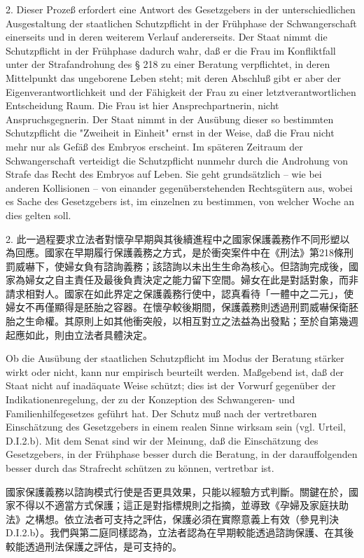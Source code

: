 \documentclass[12pt]{article}
\begin{document}
\begin{sourcepara}[title={原文SondervotumMS.278}]
2. Dieser Prozeß erfordert eine Antwort des Gesetzgebers in der unterschiedlichen Ausgestaltung der staatlichen Schutzpflicht in der Frühphase der Schwangerschaft einerseits und in deren weiterem Verlauf andererseits. Der Staat nimmt die Schutzpflicht in der Frühphase dadurch wahr, daß er die Frau im Konfliktfall unter der Strafandrohung des § 218 \abbrStGB{} zu einer Beratung verpflichtet, in deren Mittelpunkt das ungeborene Leben steht; mit deren Abschluß gibt er aber der Eigenverantwortlichkeit und der Fähigkeit der Frau zu einer letztverantwortlichen Entscheidung Raum. Die Frau ist hier Ansprechpartnerin, nicht Anspruchsgegnerin. Der Staat nimmt in der Ausübung dieser so bestimmten Schutzpflicht die "Zweiheit in Einheit" ernst in der Weise, daß die Frau nicht mehr nur als Gefäß des Embryos erscheint. Im späteren Zeitraum der Schwangerschaft verteidigt die Schutzpflicht nunmehr durch die Androhung von Strafe das Recht des Embryos auf Leben. Sie geht grundsätzlich -- wie bei anderen Kollisionen -- von einander gegenüberstehenden Rechtsgütern aus, wobei es Sache des Gesetzgebers ist, im einzelnen zu bestimmen, von welcher Woche an dies gelten soll.
\end{sourcepara}
\begin{transpara}
2. 此一過程要求立法者對懷孕早期與其後續進程中之國家保護義務作不同形塑以為回應。國家在早期履行保護義務之方式，是於衝突案件中在《刑法》第218條刑罰威嚇下，使婦女負有諮詢義務；該諮詢以未出生生命為核心。但諮詢完成後，國家為婦女之自主責任及最後負責決定之能力留下空間。婦女在此是對話對象，而非請求相對人。國家在如此界定之保護義務行使中，認真看待「一體中之二元」，使婦女不再僅顯得是胚胎之容器。在懷孕較後期間，保護義務則透過刑罰威嚇保衛胚胎之生命權。其原則上如其他衝突般，以相互對立之法益為出發點；至於自第幾週起應如此，則由立法者具體決定。
\end{transpara}

\begin{sourcepara}[title={原文SondervotumMS.279}]
Ob die Ausübung der staatlichen Schutzpflicht im Modus der Beratung stärker wirkt oder nicht, kann nur empirisch beurteilt werden. Maßgebend ist, daß der Staat nicht auf inadäquate Weise schützt; dies ist der Vorwurf gegenüber der Indikationenregelung, der zu der Konzeption des Schwangeren- und Familienhilfegesetzes geführt hat. Der Schutz muß nach der vertretbaren Einschätzung des Gesetzgebers in einem realen Sinne wirksam sein (vgl. Urteil, D.I.2.b). Mit dem Senat sind wir der Meinung, daß die Einschätzung des Gesetzgebers, in der Frühphase besser durch die Beratung, in der darauffolgenden besser durch das Strafrecht schützen zu können, vertretbar ist.
\end{sourcepara}
\begin{transpara}
國家保護義務以諮詢模式行使是否更具效果，只能以經驗方式判斷。關鍵在於，國家不得以不適當方式保護；這正是對指標規則之指摘，並導致《孕婦及家庭扶助法》之構想。依立法者可支持之評估，保護必須在實際意義上有效（參見判決 D.I.2.b）。我們與第二庭同樣認為，立法者認為在早期較能透過諮詢保護、在其後較能透過刑法保護之評估，是可支持的。
\end{transpara}
\end{document}
